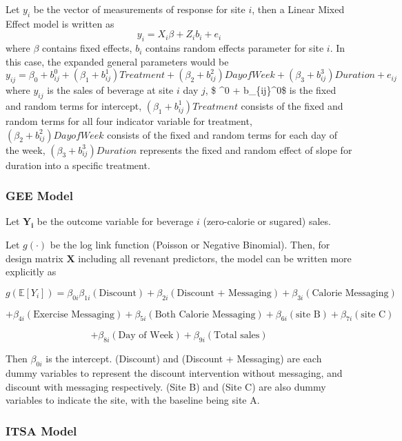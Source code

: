 \documentclass[
]{article}
\begin{document}
Let \(y_i\) be the vector of measurements of response for site \(i\),
then a Linear Mixed Effect model is written as
\[y_i = X_i\beta + Z_i b_i + e_i\] where \(\beta\) contains fixed
effects, \(b_i\) contains random effects parameter for site \(i\). In
this case, the expanded general parameters would be
\[y_{ij}  = \beta_0 + b_{ij}^0 + (\beta_1 + b_{ij}^1)Treatment + (\beta_2 + b_{ij}^2)Day of Week +(\beta_3 + b_{ij}^3)Duration +e_{ij}\]
where \(y_{ij}\) is the sales of beverage at site \(i\) day \(j\), \$
\beta\^{}0 + b\_\{ij\}\^{}0\$ is the fixed and random terms for
intercept, \((\beta_1 + b_{ij}^1)Treatment\) consists of the fixed and
random terms for all four indicator variable for treatment,
\((\beta_2 + b_{ij}^2)Day of Week\) consists of the fixed and random
terms for each day of the week, \((\beta_3 + b_{ij}^3)Duration\)
represents the fixed and random effect of slope for duration into a
specific treatment.

\hypertarget{gee-model}{%
\subsubsection{GEE Model}\label{gee-model}}

Let \(\mathbf{Y_i}\) be the outcome variable for beverage \(i\)
(zero-calorie or sugared) sales.

Let \(g(\cdot)\) be the log link function (Poisson or Negative
Binomial). Then, for design matrix \(\mathbf{X}\) including all revenant
predictors, the model can be written more explicitly as

\[
g(\mathbb{E}[Y_i]) = \beta_{0i} \beta_{1i} (\text{Discount}) + \beta_{2i} (\text{Discount + Messaging}) + \beta_{3i} (\text{Calorie Messaging}) 
\]

\[
+ \beta_{4i} (\text{Exercise Messaging}) + \beta_{5i} (\text{Both Calorie Messaging}) + \beta_{6i} (\text{site B}) + \beta_{7i} (\text{site C})
\]

\[
+ \beta_{8i} (\text{Day of Week})+ \beta_{9i} (\text{Total sales})
\]

Then \(\beta_{0i}\) is the intercept. (Discount) and (Discount +
Messaging) are each dummy variables to represent the discount
intervention without messaging, and discount with messaging
respectively. (Site B) and (Site C) are also dummy variables to indicate
the site, with the baseline being site A.

\hypertarget{itsa-model}{%
\subsubsection{ITSA Model}\label{itsa-model}}
\end{document}
